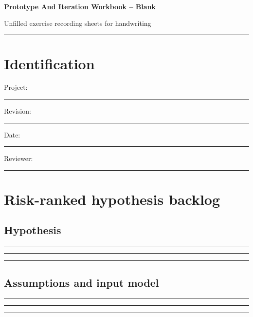 \documentclass[11pt]{article}
\begin{document}
{\huge\bfseries\color{suiteblue} Prototype And Iteration Workbook -- Blank}\par
\vspace{0.15in}
{\normalsize\color{suitegray} Unfilled exercise recording sheets for handwriting}\par
\vspace{0.15in}\hrule\vspace{0.15in}

\section{Identification}
Project: \rule{0.70\linewidth}{0.4pt}\par\vspace{0.25in}
Revision: \rule{0.36\linewidth}{0.4pt}\hfill Date: \rule{0.26\linewidth}{0.4pt}\par\vspace{0.25in}
Reviewer: \rule{0.67\linewidth}{0.4pt}\par
\clearpage

\section{Risk-ranked hypothesis backlog}

\subsection{Hypothesis}
\noindent\rule{\linewidth}{0.35pt}\par\vspace{0.22in}
\noindent\rule{\linewidth}{0.35pt}\par\vspace{0.22in}
\noindent\rule{\linewidth}{0.35pt}\par\vspace{0.18in}

\subsection{Assumptions and input model}
\noindent\rule{\linewidth}{0.35pt}\par\vspace{0.22in}
\noindent\rule{\linewidth}{0.35pt}\par\vspace{0.22in}
\noindent\rule{\linewidth}{0.35pt}\par\vspace{0.18in}
\end{document}

